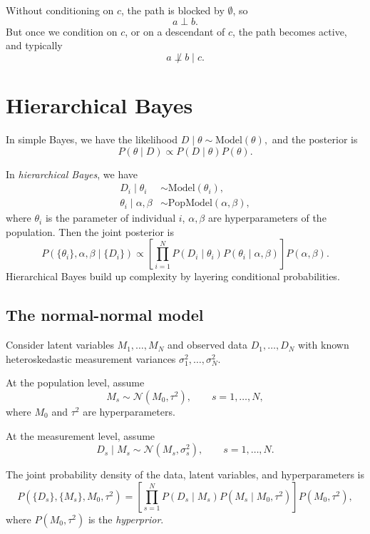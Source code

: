 \documentclass[11pt, titlepage]{article} %
\numberwithin{equation}{section}
\theoremstyle{definition}
\numberwithin{assumption}{section}
\begin{document}
Without conditioning on $c$, the path is blocked by $\emptyset$, so
$$
a \perp b.
$$
But once we condition on $c$, or on a descendant of $c$, the path becomes active, and typically
$$
a \not\perp b \mid c.
$$


\section{Hierarchical Bayes}


In simple Bayes, we have the likelihood $D\mid \theta \sim \mathrm{Model}(\theta),$
and the posterior is
\begin{equation*}
    P(\theta\mid D)\propto P(D\mid \theta)P(\theta).
\end{equation*}

In \textit{hierarchical Bayes}, we have
\begin{align*}
    D_i\mid \theta_i&\sim \mathrm{Model}(\theta_i),\\
    \theta_i\mid\alpha,\beta&\sim \mathrm{PopModel}(\alpha,\beta),
\end{align*}
where $\theta_i$ is the parameter of individual $i$, $\alpha,\beta$ are hyperparameters of the population. 
Then the joint posterior is
\begin{equation*}
    P(\{\theta_i\},\alpha,\beta\mid \{D_i\})
    \propto
    \left[\prod_{i=1}^N P(D_i\mid \theta_i)P(\theta_i\mid \alpha,\beta)\right]P(\alpha,\beta).
\end{equation*}
Hierarchical Bayes build up complexity by layering conditional probabilities. 


\subsection{The normal-normal model}
    Consider latent variables $M_1,\dots,M_N$ and observed data $D_1,\dots,D_N$ with known heteroskedastic measurement variances $\sigma_1^2,\dots,\sigma_N^2$.

At the population level, assume
\begin{equation*}
    M_s \sim \mathcal{N}(M_0,\tau^2),
    \qquad s=1,\dots,N,
\end{equation*}
where $M_0$ and $\tau^2$ are hyperparameters.

At the measurement level, assume
\begin{equation*}
    D_s\mid M_s \sim \mathcal{N}(M_s,\sigma_s^2),
    \qquad s=1,\dots,N.
\end{equation*}

The joint probability density of the data, latent variables, and hyperparameters is
\begin{equation*}
    P(\{D_s\},\{M_s\},M_0,\tau^2)
    =
    \left[\prod_{s=1}^N P(D_s\mid M_s)P(M_s\mid M_0,\tau^2)\right]P(M_0,\tau^2),
\end{equation*}
where $P(M_0,\tau^2)$ is the \textit{hyperprior}.
\end{document}
